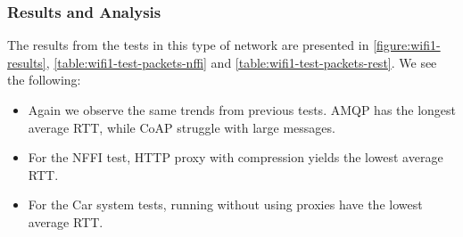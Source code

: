 \subsubsection{Results and Analysis}

The results from the tests in this type of network are presented in
\cref{figure:wifi1-results}, \cref{table:wifi1-test-packets-nffi} and
\cref{table:wifi1-test-packets-rest}. We see the following:

\begin{itemize}

    \item Again we observe the same trends from previous tests. AMQP has the
    longest average RTT, while CoAP struggle with large messages.

    \item For the NFFI test, HTTP proxy with compression yields the lowest
    average RTT.

    \item For the Car system tests, running without using proxies have the
    lowest average RTT.

\end{itemize}


\begin{landscape}
    \begin{figure}
    \centering
    \begin{floatrow}
    \end{floatrow}
    \end{figure}
\end{landscape}

